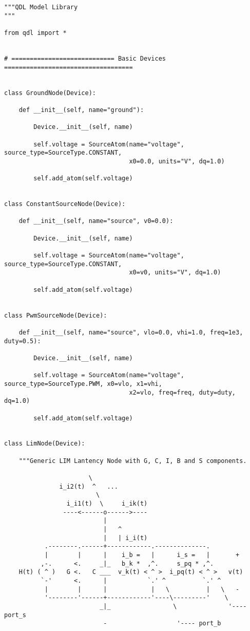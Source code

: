 
\begin{lstlisting}
"""QDL Model Library
"""

from qdl import *


# ============================ Basic Devices ===================================


class GroundNode(Device):

    def __init__(self, name="ground"):

        Device.__init__(self, name)

        self.voltage = SourceAtom(name="voltage", source_type=SourceType.CONSTANT,
                                  x0=0.0, units="V", dq=1.0)

        self.add_atom(self.voltage)


class ConstantSourceNode(Device):

    def __init__(self, name="source", v0=0.0):

        Device.__init__(self, name)

        self.voltage = SourceAtom(name="voltage", source_type=SourceType.CONSTANT,
                                  x0=v0, units="V", dq=1.0)

        self.add_atom(self.voltage)


class PwmSourceNode(Device):

    def __init__(self, name="source", vlo=0.0, vhi=1.0, freq=1e3, duty=0.5):

        Device.__init__(self, name)

        self.voltage = SourceAtom(name="voltage", source_type=SourceType.PWM, x0=vlo, x1=vhi,
                                  x2=vlo, freq=freq, duty=duty, dq=1.0)

        self.add_atom(self.voltage)


class LimNode(Device):

    """Generic LIM Lantency Node with G, C, I, B and S components.

                       \
               i_i2(t)  ^   ...
                         \
                 i_i1(t)  \     i_ik(t)
                ----<------o------>----
                           |
                           |   ^
                           |   | i_i(t)
           .--------.------+------------.--------------.
           |        |      |    i_b =   |      i_s =   |       +
          ,-.      <.     _|_   b_k *  ,^.     s_pq * ,^.
    H(t) ( ^ )   G <.   C ___  v_k(t) < ^ >  i_pq(t) < ^ >   v(t)
          `-'      <.      |           `.' ^          `.' ^
           |        |      |            |   \          |   \   -
           '--------'------+------------'----\---------'    \
                          _|_                 \              '---- port_s
                           -                   '---- port_b


\end{lstlisting}
